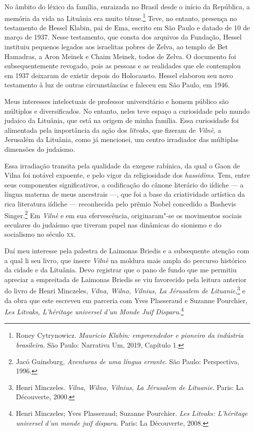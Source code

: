 No âmbito do léxico da família, enraizada no Brasil desde o início da
República, a memória da vida na Lituânia era muito tênue.\footnote{Roney Cytrynowicz. 
\textit{Mauricio Klabin: empreendedor e pioneiro da indústria brasileira}. São Paulo: Narrativa 
Um, 2019, Capítulo 1.} Teve, no entanto, presença no testamento de
Hessel Klabin, pai de Ema, escrito em São Paulo e datado de 10 de março
de 1937. Nesse testamento, que consta dos arquivos da Fundação, Hessel
instituiu pequenos legados aos israelitas pobres de Zelva, ao templo de
Bet Hamadras, a Aron Meinek e Chaim Meinek, todos de Zelva. O documento
foi subsequentemente revogado, pois as pessoas e as realidades que ele
contemplou em 1937 deixaram de existir depois do Holocausto. Hessel
elaborou seu novo testamento à luz de outras circunstâncias e faleceu em
São Paulo, em 1946.

Meus interesses intelectuais de professor universitário e homem público
são múltiplos e diversificados. No entanto, neles teve espaço a
curiosidade pelo mundo judaico da Lituânia, que está na origem de minha
família. Essa curiosidade foi alimentada pela importância da ação dos
\textit{litvaks}, que fizeram de \textit{Vilnè}, a Jerusalém da Lituânia, como já
mencionei, um centro irradiador das múltiplas dimensões do judaísmo.

Essa irradiação transita pela qualidade da exegese rabínica, da qual o
Gaon de Vilna foi notável expoente, e pelo vigor da religiosidade dos
\textit{hassidims}. Tem, entre seus componentes significativos, a
codificação do cânone literário do iídiche --- a língua materna de meus
ancestrais ---, que foi a base da criatividade artística da rica
literatura iídiche --- reconhecida pelo prêmio Nobel concedido a Bashevis
Singer.\footnote{Jacó Guinsburg, \textit{Aventuras de uma língua
  errante}. São Paulo: Perspectiva, 1996.} Em \textit{Vilnè} e em sua
efervescência, originaram"-se os movimentos sociais seculares do judaísmo
que tiveram papel nas dinâmicas do sionismo e do socialismo no século
\textsc{xx}.

Daí meu interesse pela palestra de Laimonas Briedis e a subsequente
atenção com a qual li seu livro, que insere \textit{Vilnè} na moldura mais ampla
do percurso histórico da cidade e da Lituânia. Devo registrar que o pano
de fundo que me permitiu apreciar a empreitada de Laimonas Briedis se
viu favorecido pela leitura anterior do livro de Henri Minczeles,
\textit{Vilna, Wilno, \textit{Vilnius}, La Jérusalem de Lituanie},\footnote{Henri
  Minczeles. \textit{Vilna, Wilno, \textit{Vilnius}, La Jérusalem de Lituanie}. Paris: La Découverte, 2000.} e da obra que este escreveu em
parceria com Yves Plasseraud e Suzanne Pourchier, \textit{Les Litvaks,
L'héritage universel d'un Monde Juif Disparu}.\footnote{Henri Minczeles;
  Yves Plasseraud; Suzanne Pourchier. \textit{Les Litvaks: L'héritage universel d'un monde juif disparu}. Paris: La Découverte, 2008.}

